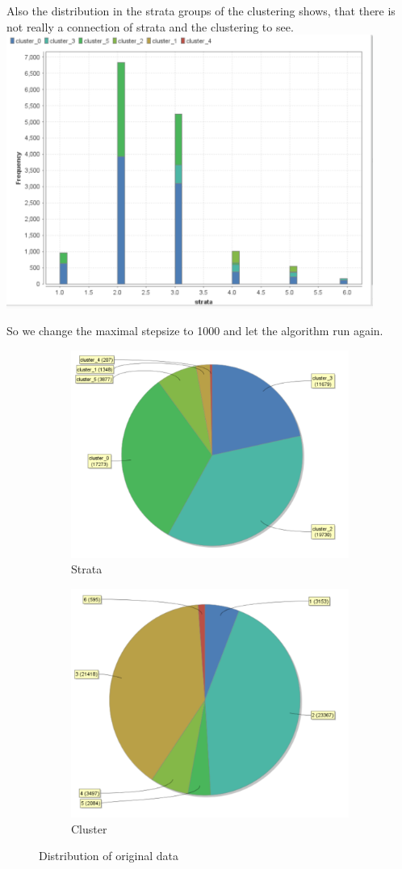 Also the distribution in the strata groups of the clustering shows, that there is not really a connection of strata and the clustering to see.
\includegraphics[width=0.9\textwidth]{vectorClustering.PNG}

So we change the maximal stepsize to 1000 and let the algorithm run again.

\begin{figure}[h]
\centering
\begin{subfigure}{.5\textwidth}
  \centering
  \includegraphics[width=.4\linewidth]{vectorclusteringcluster1000.PNG}
  \caption{Strata}
  \label{fig:OrgSt}
\end{subfigure}%
\begin{subfigure}{.5\textwidth}
  \centering
  \includegraphics[width=.4\linewidth]{vectorclusteringstrata.PNG}
  \caption{Cluster}
  \label{fig:OrgCl}
\end{subfigure}
\caption{Distribution of original data}
\label{fig:OrgDist}
\end{figure}

